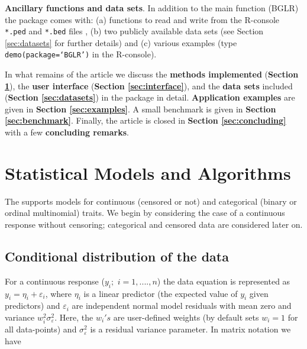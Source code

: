 \documentclass[article,shortnames,nojss]{jss}
\begin{document}
\textbf{Ancillary functions and data sets}. In addition to the main 
function (BGLR) the package comes with: (a) functions to read 
and write from the R-console \texttt{*.ped} and \texttt{*.bed} files 
\citep{Purcell:2007}, (b) two publicly available data sets 
(see Section \ref{sec:datasets} for further details)
and (c) various examples (type \texttt{demo(package=`BGLR')} in the R-console). 

In what remains of the article we discuss the 
\textbf{methods implemented} (\textbf{Section \ref{sec:methods}}), the 
\textbf{user interface}  (\textbf{Section \ref{sec:interface}}), and the \textbf{data sets} 
included (\textbf{Section \ref{sec:datasets}}) in the  package in detail. 
\textbf{Application examples} are given in \textbf{Section \ref{sec:examples}}. 
A small benchmark is given in \textbf{Section \ref{sec:benchmark}}. Finally, the article 
is closed in \textbf{Section \ref{sec:concluding}} with a few \textbf{concluding remarks}.  


\section{Statistical Models and Algorithms}
\label{sec:methods}


The  supports models for continuous (censored or not) and categorical 
(binary or ordinal multinomial) traits. We begin by 
considering the case of a continuous response 
without censoring; categorical and 
censored data are considered later on.

\subsection{Conditional distribution of the data}

For a continuous response ($y_i;\,\, i=1,....,n$) the data equation 
is represented as  $y_i=\eta_i+\varepsilon_i$, 
where $\eta_i$ is a linear predictor 
(the expected value of  $y_i$ given predictors) 
and $\varepsilon_i$ are independent normal model 
residuals with mean zero and variance $w_i^2 \sigma_\varepsilon^2$. Here, the $w_i's$ 
are user-defined weights (by default  sets $w_i=1$ 
for all data-points) and $\sigma_\varepsilon^2$ is a residual 
variance parameter. In matrix notation we have
\end{document}
